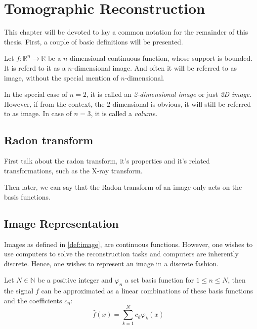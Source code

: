 \chapter{Tomographic Reconstruction}

This chapter will be devoted to lay a common notation for the remainder of this thesis. First,
a couple of basic definitions will be presented.

\begin{definition}[Image]
    \label{def:image}
    Let \(f\colon \mathbb{R}^n \to \mathbb{R}\) be a \(n\)-dimensional continuous function, whose support is
    bounded. It is referd to it as a \(n\)-dimensional image. And often it will be referred to as image,
    without the special mention of \(n\)-dimensional.
\end{definition}

In the special case of \(n=2\), it is called an \textit{2-dimensional image} or just
\textit{2D image}. However, if from the context, the \(2\)-dimensional is obvious, it will still be
referred to as image. In case of \(n=3\), it is called a \textit{volume}.

\section{Radon transform}

First talk about the radon transform, it's properties and it's related transformations,
such as the X-ray transform.

Then later, we can say that the Radon transform of an image only acts on the basis functions.

\section{Image Representation}

Images as defined in \ref{def:image}, are continuous functions. However, one wishes to use computers
to solve the reconstruction tasks and computers are inherently discrete. Hence, one wishes to
represent an image in a discrete fashion.

\begin{definition}
    \label{def:permissible_representation}
    Let \(N \in \mathbb{N}\) be a positive integer and \(\varphi_n\) a set basis function for
    \(1 \leq n \leq N\), then the signal \(f\) can be approximated as a linear combinations
    of these basis functions and the coefficients \(c_n\):
    \[ \hat{f}(x) = \sum_{k=1}^{N} c_k \varphi_k(x) \]
\end{definition}

